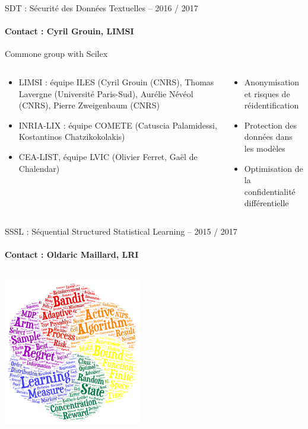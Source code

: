 \begin{frame}{SDT : Sécurité des Données Textuelles – 2016 / 2017}
\framesubtitle{Contact : Cyril Grouin, LIMSI}
{\color{blue} }
Commone group with Scilex
\begin{columns}
\begin{column}{8cm}
\begin{itemize}
\item LIMSI : équipe ILES (Cyril Grouin (CNRS), Thomas Lavergne (Université Paris-Sud), Aurélie Névéol (CNRS), Pierre Zweigenbaum (CNRS)
\item INRIA-LIX : équipe COMETE (Catuscia Palamidessi, Kostantinos Chatzikokolakis)
\item CEA-LIST, équipe LVIC (Olivier Ferret, Gaël de Chalendar)
\end{itemize}
\end{column}
\begin{column}{5cm}
\begin{itemize}
\item
Anonymisation et risques de réidentification
\item
Protection des données dans les modèles
\item
Optimisation de la confidentialité différentielle
\end{itemize}
\end{column}
\end{columns}
\end{frame}

\begin{frame}{SSSL : Séquential Structured Statistical Learning – 2015 / 2017}
\framesubtitle{Contact : Oldaric Maillard, LRI}
\begin{columns}
\begin{column}{10cm}
\includegraphics[width=6cm]{Images/Cloud-13.png}
\end{column}
\end{columns}
\end{frame}
